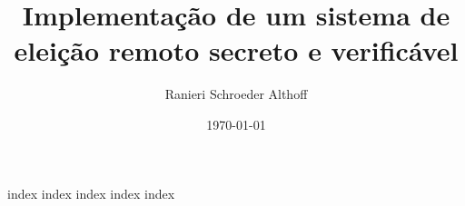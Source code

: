 \documentclass[
    a5paper,
    twoside,
    english,
    brazil,
    chapter=TITLE,
    section=TITLE,
]{abntex2}
\title{Implementação de um sistema de eleição remoto secreto e verificável}
\author{Ranieri Schroeder Althoff}
\date{\today}
\begin{document}
\sffamily

\pretextual



\textual

{index}
{index}
{index}
{index}
{index}

\printbibliography
\end{document}
